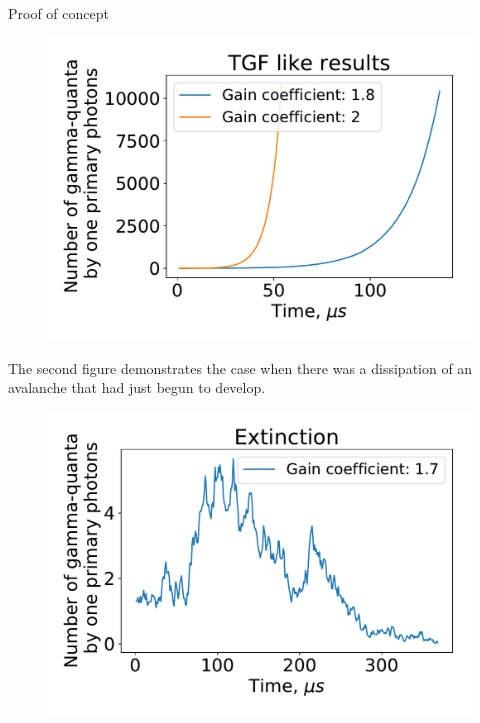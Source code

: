 \documentclass[final,hyperref={pdfpagelabels=false}]{beamer}
\begin{document}
\begin{frame}{}
\begin{columns}[t]
\begin{column}{0.32\linewidth}
\begin{block}{Proof of concept}
				\begin{figure}[htb]
					\centering
					\includegraphics[width=1\columnwidth]{proofTGF.pdf}
				\end{figure}
            
                The second figure demonstrates the case when there was a dissipation of an avalanche that had just begun to develop.
				\begin{figure}[htb]
					\centering
					\includegraphics[width=1\columnwidth]{Extinction.pdf}
				\end{figure}
            

\end{block}
\end{column}
\end{columns}
\end{frame}
\end{document}
